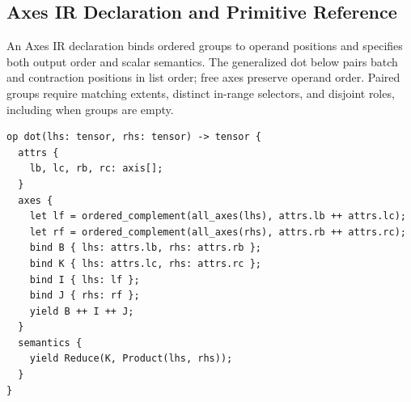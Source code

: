 \subsection{Axes IR Declaration and Primitive Reference}
\label{app:axes-ir-declarations-primitives}
An Axes IR declaration binds ordered groups to operand positions and
specifies both output order and scalar semantics. The generalized dot below
pairs batch and contraction positions in list order; free axes preserve
operand order. Paired groups require matching extents, distinct in-range
selectors, and disjoint roles, including when groups are empty.

\begin{lstlisting}[language=TEPL,
  caption={Axes IR representation of generalized dot, with explicit attributes, axis bindings, and value semantics.},
  label={lst:dot-declaration}]
op dot(lhs: tensor, rhs: tensor) -> tensor {
  attrs {
    lb, lc, rb, rc: axis[];
  }
  axes {
    let lf = ordered_complement(all_axes(lhs), attrs.lb ++ attrs.lc);
    let rf = ordered_complement(all_axes(rhs), attrs.rb ++ attrs.rc);
    bind B { lhs: attrs.lb, rhs: attrs.rb };
    bind K { lhs: attrs.lc, rhs: attrs.rc };
    bind I { lhs: lf };
    bind J { rhs: rf };
    yield B ++ I ++ J;
  }
  semantics {
    yield Reduce(K, Product(lhs, rhs));
  }
}
\end{lstlisting}

